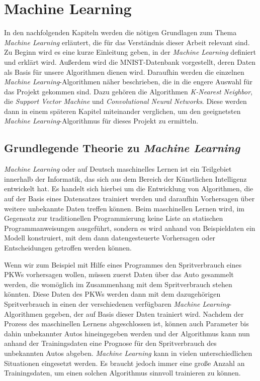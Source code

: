\section{Machine Learning} \label{sec:machinelearning}
In den nachfolgenden Kapiteln werden die nötigen Grundlagen zum Thema \textit{Machine Learning} erläutert, die für das Verständnis dieser Arbeit relevant sind.
Zu Beginn wird es eine kurze Einleitung geben, in der \textit{Machine Learning} definiert und erklärt wird. Außerdem wird die MNIST-Datenbank vorgestellt, deren
Daten als Basis für unsere Algorithmen dienen wird. Daraufhin werden die einzelnen \textit{Machine Learning}-Algorithmen näher beschrieben, die in die engere
Auswahl für das Projekt gekommen sind. Dazu gehören die Algorithmen \textit{K-Nearest Neighbor}, die \textit{Support Vector Machine} und \textit{Convolutional
Neural Networks}. Diese werden dann in einem späteren Kapitel miteinander verglichen, um den geeignetsten \textit{Machine Learning}-Algorithmus 
für dieses Projekt zu ermitteln.

\subsection{Grundlegende Theorie zu \textit{Machine Learning}}
\textit{Machine Learning} oder auf Deutsch maschinelles Lernen ist ein Teilgebiet innerhalb der Informatik, das sich aus dem Bereich der Künstlichen Intelligenz
entwickelt hat. Es handelt sich hierbei um die Entwicklung von Algorithmen, die auf der Basis eines Datensatzes trainiert werden und daraufhin Vorhersagen über
weitere unbekannte Daten treffen können. Beim maschinellen Lernen wird, im Gegensatz zur traditionellen Programmierung keine Liste an statischen Programmanweisungen
ausgeführt, sondern es wird anhand von Beispieldaten ein Modell konstruiert, mit dem dann datengesteuerte Vorhersagen oder Entscheidungen getroffen werden
können.\cite{simon_2015}

Wenn wir zum Beispiel mit Hilfe eines Programmes den Spritverbrauch eines PKWs vorhersagen wollen, müssen zuerst Daten über das Auto gesammelt werden, die womöglich
im Zusammenhang mit dem Spritverbrauch stehen könnten. Diese Daten des PKWs werden dann mit dem dazugehörigen Spritverbrauch in einen der verschiedenen verfügbaren 
\textit{Machine Learning}-Algorithmen gegeben, der auf Basis dieser Daten trainiert wird. 
Nachdem der Prozess des maschinellen Lernens abgeschlossen ist, können auch Parameter bis dahin unbekannter Autos hineingegeben werden und der Algorithmus kann nun
anhand der Trainingsdaten eine Prognose für den Spritverbrauch des unbekannten Autos abgeben.
\textit{Machine Learning} kann in vielen unterschiedlichen Situationen eingesetzt werden. Es braucht jedoch immer eine große Anzahl an Trainingsdaten, um einen
solchen Algorithmus sinnvoll trainieren zu können.

